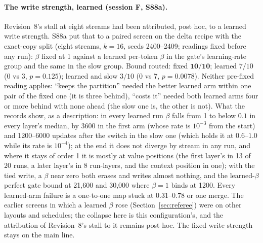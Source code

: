 \documentclass[11pt]{article}
\begin{document}
\paragraph{The write strength, learned (session F, S88a).} Revision~8's stall at eight streams had been attributed, post hoc, to a learned write strength. S88a put that to a paired screen on the delta recipe with the exact-copy split (eight streams, $k = 16$, seeds 2400--2409; readings fixed before any run): $\beta$ fixed at 1 against a learned per-token $\beta$ in the gate's learning-rate group and the same in the slow group. Bound routed: fixed $\mathbf{10/10}$; learned $7/10$ (0 vs 3, $p = 0.125$); learned and slow $3/10$ (0 vs 7, $p = 0.0078$). Neither pre-fixed reading applies: ``keeps the partition'' needed the better learned arm within one pair of the fixed one (it is three behind), ``costs it'' needed both learned arms four or more behind with none ahead (the slow one is, the other is not). What the records show, as a description: in every learned run $\beta$ falls from 1 to below $0.1$ in every layer's median, by 3600 in the first arm (whose rate is $10^{-3}$ from the start) and 1200--6000 updates after the switch in the slow one (which holds it at $0.6$--$1.0$ while its rate is $10^{-4}$); at the end it does not diverge by stream in any run, and where it stays of order 1 it is mostly at value positions (the first layer's in 13 of 20 runs, a later layer's in 8 run-layers, and the context position in one); with the tied write, a $\beta$ near zero both erases and writes almost nothing, and the learned-$\beta$ perfect gate bound at 21{,}600 and 30{,}000 where $\beta = 1$ binds at 1200. Every learned-arm failure is a one-to-one map stuck at $0.31$--$0.78$ or one merge. The earlier screens in which a learned $\beta$ rose (Section~\ref{sec:referee}) were on other layouts and schedules; the collapse here is this configuration's, and the attribution of Revision~8's stall to it remains post hoc. The fixed write strength stays on the main line.
\end{document}
